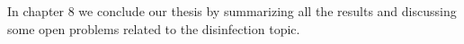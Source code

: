 In chapter 8 we conclude our thesis by summarizing all the results and discussing some open problems related to the \bv disinfection topic.

